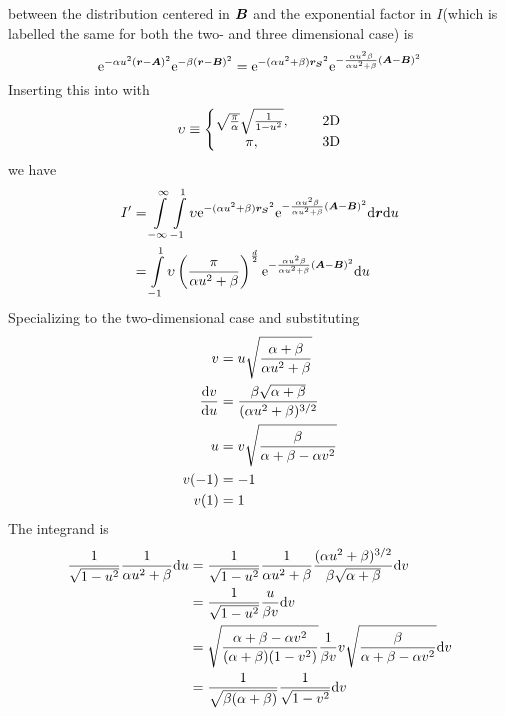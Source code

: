     between the distribution centered in $\boldsymbol{{B}}$ and the exponential factor
    in $I$(which is labelled the same for both the two- and three dimensional
    case) is
        \begin{equation}
            \mathrm{e}^{-\alpha u^2(\boldsymbol{{r}}-\boldsymbol{{A}})^2} \mathrm{e}^{-\beta(\boldsymbol{{r}} -
            \boldsymbol{{B}})^2} = \mathrm{e}^{-(\alpha u^2 + \beta)\boldsymbol{{r_S}}^2}
            \mathrm{e}^{-\frac{\alpha u^2\beta}{\alpha u^2 + \beta}
            (\boldsymbol{{A}}-\boldsymbol{{B}})^2}
        \end{equation}
    Inserting this into  with
        \begin{equation}
            \upsilon \equiv \left\{
                \begin{matrix}
                    \sqrt{\frac{\pi}{\alpha}}\sqrt{\frac{1}{1-u^2}},&\indent
                    \text{2D} \\
                    \pi,&\indent \text{3D}
                \end{matrix}\right.
        \end{equation}
    we have
        \begin{align}
            I' &= \int\limits^{\infty}_{-\infty} \int\limits^1_{-1} \upsilon \mathrm{e}^{-(\alpha u^2 +
            \beta)\boldsymbol{{r_S}}^2} \mathrm{e}^{-\frac{\alpha u^2\beta}{\alpha u^2 +
            \beta} (\boldsymbol{{A}}-\boldsymbol{{B}})^2} \mathrm{d}\boldsymbol{{r}}\mathrm{d} u \nonumber \\
            &= \int\limits^1_{-1} \upsilon \left(\frac{\pi}{\alpha u^2 +
            \beta}\right)^{\frac{d}{2}} \mathrm{e}^{-\frac{\alpha u^2\beta}{\alpha u^2
            + \beta}(\boldsymbol{{A}}-\boldsymbol{{B}})^2} \mathrm{d} u
        \end{align}
    Specializing to the two-dimensional case and substituting
        \begin{equation}
            \begin{aligned}
                v &= u\sqrt{\frac{\alpha+\beta}{\alpha u^2 + \beta}} \\
                \frac{\mathrm{d} v}{\mathrm{d} u} &= \frac{\beta\sqrt{\alpha+\beta}}{(\alpha
                u^2 + \beta)^{3/2}} \\
                u &= v \sqrt{\frac{\beta}{\alpha+\beta - \alpha v^2}} \\
                v(-1) &= -1 \\
                v(1) &= 1
            \end{aligned}
        \end{equation}
    The integrand is
        \begin{align}
            \frac{1}{\sqrt{1 - u^2}} \frac{1}{\alpha u^2 + \beta} \mathrm{d} u &=
            \frac{1}{\sqrt{1-u^2}} \frac{1}{\alpha u^2 + \beta} \frac{(\alpha
            u^2 + \beta)^{3/2}}{\beta\sqrt{\alpha+\beta}}\mathrm{d} v \nonumber \\
            &= \frac{1}{\sqrt{1-u^2}} \frac{u}{\beta v}\mathrm{d} v \nonumber \\
            &= \sqrt{\frac{\alpha+\beta -\alpha
            v^2}{(\alpha+\beta)(1-v^2)}}\frac{1}{\beta
            v}v\sqrt{\frac{\beta}{\alpha+\beta-\alpha v^2}} \mathrm{d} v \nonumber \\
            &= \frac{1}{\sqrt{\beta(\alpha+\beta)}} \frac{1}{\sqrt{1 - v^2}}
            \mathrm{d} v
        \end{align}
